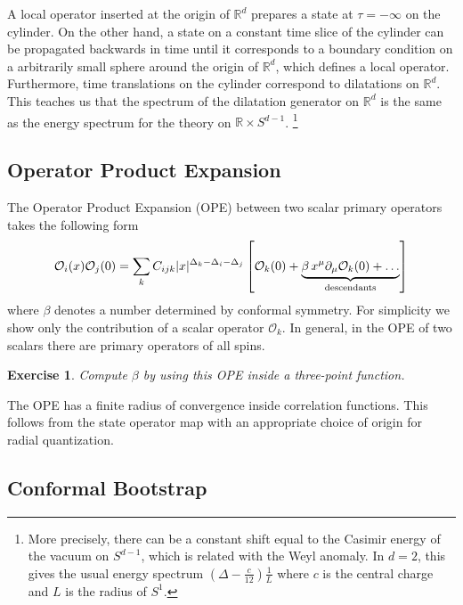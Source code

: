 \documentclass{ws-rv9x6}
\newtheorem{exercise}{Exercise}[section]
\newcommand\be{\begin{equation}}
\newcommand\ee{\end{equation}}
\begin{document}
A local operator inserted at the origin of $\mathbb{R}^{d}$ prepares
a state at $\tau=-\infty$ on the cylinder. On the other hand, a state
on a constant time slice of the cylinder can be propagated backwards
in time until it corresponds to a boundary condition on a arbitrarily
small sphere around the origin of $\mathbb{R}^{d}$, which defines
a local operator. Furthermore, time translations on the cylinder correspond
to dilatations on $\mathbb{R}^{d}$. This teaches us that the spectrum
of the dilatation generator on $\mathbb{R}^{d}$ is the same as the
energy spectrum for the theory on $\mathbb{R}\times S^{d-1}$. \footnote{
More precisely, there can be a constant shift equal to the Casimir energy of the vacuum on $S^{d-1}$, which is related with the Weyl anomaly. In $d=2$, this gives the usual energy spectrum $\left(\Delta-\frac{c}{12}\right)\frac{1}{L}$ where $c$ is the central charge and $L$ is the radius of $S^1$.
}




\subsection{Operator Product Expansion}

The Operator Product Expansion (OPE) between two scalar primary operators
takes the following form
\be
\mathcal{O}_{i}(x)\mathcal{O}_{j}(0)=\sum_{k}C_{ijk}|x|^{\Delta_{k}-\Delta_{i}-\Delta_{j}}\left[\mathcal{O}_{k}(0)+\underbrace{\beta\, x^{\mu}\partial_{\mu}\mathcal{O}_{k}(0)+\dots}_{{\rm descendants}}\right]
\ee
where $\beta$ denotes a number determined by conformal symmetry. 
For simplicity we show only the contribution of a scalar operator $\mathcal{O}_{k}$. In general, in the OPE of two scalars there are primary operators of all spins.

\begin{exercise} 
Compute $\beta$ by using this OPE inside a three-point
function.
\end{exercise}

The OPE has a finite radius of convergence inside correlation functions.
This follows from the state operator map with an appropriate choice
of origin for radial quantization.




\subsection{Conformal Bootstrap}
\end{document}
